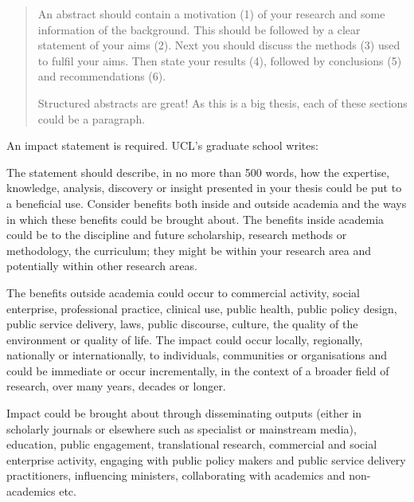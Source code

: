 {}
\begin{abstract}   

An abstract should contain a motivation (1) of your research and some information of the background. This should be followed by a clear statement of your aims (2). Next you should discuss the methods (3) used to fulfil your aims. Then state your results (4), followed by conclusions (5) and recommendations (6). 

Structured abstracts are great! As this is a big thesis, each of these sections could be a paragraph.

\end{abstract}
\cleardoublepage

{}
\vspace*{3cm}
\begin{impact}

An impact statement is required. UCL's graduate school writes:

\begin{displayquote}
The statement should describe, in no more than 500 words, how the expertise, knowledge, analysis, 
discovery or insight presented in your thesis could be put to a beneficial use.  Consider benefits 
both inside and outside academia and the ways in which these benefits could be brought about. 
The benefits inside academia could be to the discipline and future scholarship, research methods 
or methodology, the curriculum; they might be within your research area and potentially within other 
research areas.  

The benefits outside academia could occur to commercial activity, social enterprise, professional 
practice, clinical use, public health, public policy design, public service delivery, laws, public 
discourse, culture, the quality of the environment or quality of life.  
The impact could occur locally, regionally, nationally or internationally, to individuals, communities 
or organisations and could be immediate or occur incrementally, in the context of a broader field 
of research, over many years, decades or longer.  

Impact could be brought about through disseminating outputs (either in scholarly journals or 
elsewhere such as specialist or mainstream media), education, public engagement, translational 
research, commercial and social enterprise activity, engaging with public policy makers and public 
service delivery practitioners, influencing ministers, collaborating with academics and non-academics etc.
\end{displayquote}

\end{impact}
\cleardoublepage

